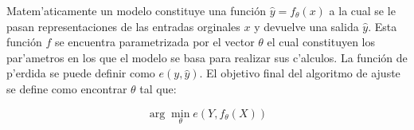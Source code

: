 Matem'aticamente un modelo constituye una función $\hat{y} = f_{\theta}(x)$ a la cual se 
le pasan representaciones de las entradas orginales $x$ y devuelve una salida $\hat{y}$. Esta función $f$ se encuentra
parametrizada por el vector $\theta$ el cual constituyen los par'ametros en los que el modelo se basa para realizar sus
c'alculos. La función de p'erdida se puede definir como $e(y, \hat{y})$. El objetivo final del algoritmo de ajuste 
se define como encontrar $\theta$ tal que:

\begin{equation}
	\arg \min_{\theta} e(Y, f_{\theta}(X))
\end{equation}







